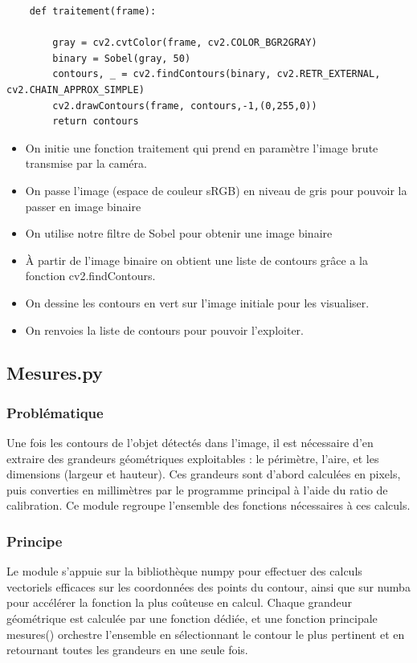 \documentclass[titlepage]{article}
\begin{document}
	\begin{lstlisting}
	def traitement(frame):
		
		gray = cv2.cvtColor(frame, cv2.COLOR_BGR2GRAY)
		binary = Sobel(gray, 50)
		contours, _ = cv2.findContours(binary, cv2.RETR_EXTERNAL, cv2.CHAIN_APPROX_SIMPLE)
		cv2.drawContours(frame, contours,-1,(0,255,0))
		return contours
	\end{lstlisting}
	\begin{itemize}
		\item
		On initie une fonction traitement qui prend en paramètre l'image brute transmise par la caméra.
		\item 
		On passe l'image (espace de couleur sRGB) en niveau de gris pour pouvoir la passer en image binaire
		\item
		On utilise notre filtre de Sobel pour obtenir une image binaire 
		\item 
		À partir de l'image binaire on obtient une liste de contours grâce a la fonction cv2.findContours.
		\item
		On dessine les contours en vert sur l'image initiale pour les visualiser.
		\item
		On renvoies la liste de contours pour pouvoir l'exploiter.
	\end{itemize}
	\subsection{Mesures.py}
	\subsubsection{Problématique}
	Une fois les contours de l'objet détectés dans l'image, il est nécessaire d'en extraire des grandeurs géométriques exploitables : le périmètre, l'aire, et les dimensions (largeur et hauteur). Ces grandeurs sont d'abord calculées en pixels, puis converties en millimètres par le programme principal à l'aide du ratio de calibration. Ce module regroupe l'ensemble des fonctions nécessaires à ces calculs.
	
	\subsubsection{Principe}
	Le module s'appuie sur la bibliothèque numpy pour effectuer des calculs vectoriels efficaces sur les coordonnées des points du contour, ainsi que sur numba pour accélérer la fonction la plus coûteuse en calcul. Chaque grandeur géométrique est calculée par une fonction dédiée, et une fonction principale mesures() orchestre l'ensemble en sélectionnant le contour le plus pertinent et en retournant toutes les grandeurs en une seule fois.
\end{document}
